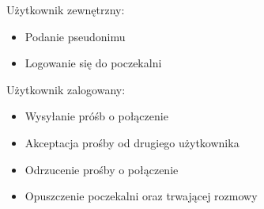 Użytkownik zewnętrzny: 
\begin{itemize}
\item Podanie pseudonimu
\item Logowanie się do poczekalni
\end{itemize}
Użytkownik zalogowany:
\begin{itemize}
	\item Wysyłanie próśb o połączenie
	\item Akceptacja prośby od drugiego użytkownika
	\item Odrzucenie prośby o połączenie
	\item Opuszczenie poczekalni oraz trwającej rozmowy	
\end{itemize}
